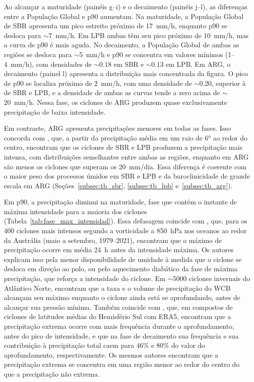 Ao alcançar a maturidade (painéis g--i) e o decaimento (painéis j--l), as diferenças entre a População Global e p90 aumentam.
Na maturidade, a População Global de SBR apresenta um pico estreito próximo de 17~mm/h, enquanto p90 se desloca para ${\sim}$7~mm/h. Em LPB ambas têm seu pico próximo de 10~mm/h, mas a curva de p90 é mais aguda. No decaimento, a População Global de ambas as regiões se desloca para ${\sim}$5~mm/h e p90 se concentra em valores mínimos (1--4~mm/h), com densidades de ${\sim}$0.18 em SBR e ${\sim}$0.13 em LPB.
Em ARG, o decaimento (painel l) apresenta a distribuição mais concentrada da figura. O pico de p90 se localiza próximo de 2~mm/h, com uma densidade de ${\sim}$0.20, superior à de SBR e LPB, e a densidade de ambas as curvas tende a zero acima de ${\sim}$20~mm/h. Nessa fase, os ciclones de ARG produzem quase exclusivamente precipitação de baixa intensidade.

Em contraste, ARG apresenta precipitações menores em todas as fases. Isso concorda com \citet{gramcianinov2019properties}, que, a partir da precipitação média em um raio de 6° ao redor do centro, encontram que os ciclones de SBR e LPB produzem a precipitação mais intensa, com distribuições semelhantes entre ambas as regiões, enquanto em ARG são menos os ciclones que superam os 20~mm/dia. Essa diferença é coerente com o maior peso dos processos úmidos em SBR e LPB e da baroclinicidade de grande escala em ARG (Seções~\ref{subsec:tb_sbr}, \ref{subsec:tb_lpb} e~\ref{subsec:tb_arg}).

Em p90, a precipitação diminui na maturidade, fase que contém o instante de máxima intensidade para a maioria dos ciclones (Tabela~\ref{tab:fase_max_intensidad}). Essa defasagem coincide com \citet{dacre2023climatology}, que, para os 400 ciclones mais intensos segundo a vorticidade a 850~hPa nos oceanos ao redor da Austrália (maio a setembro, 1979--2021), encontram que o máximo de precipitação ocorre em média 24~h antes da intensidade máxima. Os autores explicam isso pela menor disponibilidade de umidade à medida que o ciclone se desloca em direção ao polo, ou pelo aquecimento diabático da fase de máxima precipitação, que reforça a intensidade do ciclone. Em ${\sim}$5000 ciclones invernais do Atlântico Norte, \citet{heitmann2024lifecycle} encontram que a taxa e o volume de precipitação do WCB alcançam seu máximo enquanto o ciclone ainda está se aprofundando, antes de alcançar sua pressão mínima.
Também coincide com \citet{mcerlich2023extremes}, que, em compostos de ciclones de latitudes médias do Hemisfério Sul com ERA5, encontram que a precipitação extrema ocorre com mais frequência durante o aprofundamento, antes do pico de intensidade, e que na fase de decaimento sua frequência e sua contribuição à precipitação total caem para 46\% e 80\% do valor do aprofundamento, respectivamente. Os mesmos autores encontram que a precipitação extrema se concentra em uma região menor ao redor do centro do que a precipitação não extrema.


